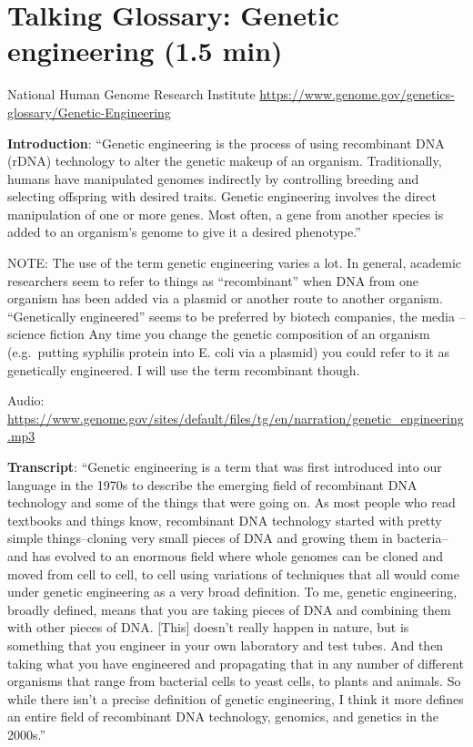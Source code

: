 \documentclass[
]{book}
\begin{document}
\hypertarget{talking-glossary-genetic-engineering-1.5-min}{%
\section{Talking Glossary: Genetic engineering (1.5 min)}\label{talking-glossary-genetic-engineering-1.5-min}}

National Human Genome Research Institute
\url{https://www.genome.gov/genetics-glossary/Genetic-Engineering}

\textbf{Introduction}: ``Genetic engineering is the process of using recombinant DNA (rDNA) technology to alter the genetic makeup of an organism. Traditionally, humans have manipulated genomes indirectly by controlling breeding and selecting offspring with desired traits. Genetic engineering involves the direct manipulation of one or more genes. Most often, a gene from another species is added to an organism's genome to give it a desired phenotype.''

NOTE: The use of the term genetic engineering varies a lot. In general, academic researchers seem to refer to things as ``recombinant'' when DNA from one organism has been added via a plasmid or another route to another organism. ``Genetically engineered'' seems to be preferred by biotech companies, the media -- science fiction Any time you change the genetic composition of an organism (e.g.~putting syphilis protein into E. coli via a plasmid) you could refer to it as genetically engineered. I will use the term recombinant though.

Audio: \url{https://www.genome.gov/sites/default/files/tg/en/narration/genetic_engineering.mp3}

\textbf{Transcript}: ``Genetic engineering is a term that was first introduced into our language in the 1970s to describe the emerging field of recombinant DNA technology and some of the things that were going on. As most people who read textbooks and things know, recombinant DNA technology started with pretty simple things--cloning very small pieces of DNA and growing them in bacteria--and has evolved to an enormous field where whole genomes can be cloned and moved from cell to cell, to cell using variations of techniques that all would come under genetic engineering as a very broad definition. To me, genetic engineering, broadly defined, means that you are taking pieces of DNA and combining them with other pieces of DNA. {[}This{]} doesn't really happen in nature, but is something that you engineer in your own laboratory and test tubes. And then taking what you have engineered and propagating that in any number of different organisms that range from bacterial cells to yeast cells, to plants and animals. So while there isn't a precise definition of genetic engineering, I think it more defines an entire field of recombinant DNA technology, genomics, and genetics in the 2000s.''
\end{document}
